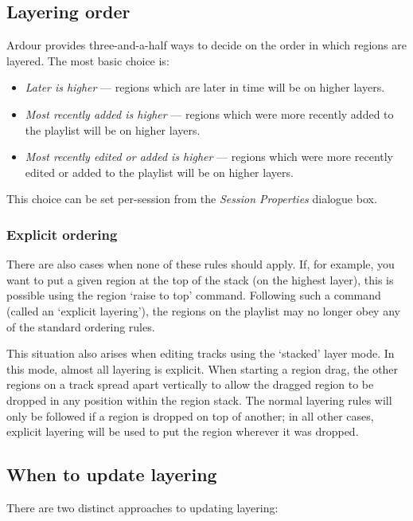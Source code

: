 \documentclass{article}
\begin{document}
\subsection{Layering order}

Ardour provides three-and-a-half ways to decide on the order in which
regions are layered.  The most basic choice is:

\begin{itemize}
\item \emph{Later is higher} --- regions which are later in time will
  be on higher layers.
\item \emph{Most recently added is higher} --- regions which were more
  recently added to the playlist will be on higher layers.
\item \emph{Most recently edited or added is higher} --- regions which
  were more recently edited or added to the playlist will be on
  higher layers.
\end{itemize}

This choice can be set per-session from the \emph{Session Properties} dialogue
box.

\subsubsection{Explicit ordering}

There are also cases when none of these rules should apply.  If, for
example, you want to put a given region at the top of the stack (on
the highest layer), this is possible using the region `raise to top'
command.  Following such a command (called an `explicit layering'),
the regions on the playlist may no longer obey any of the standard
ordering rules.

This situation also arises when editing tracks using the `stacked' layer mode.
In this mode, almost all layering is explicit.  When starting a region drag,
the other regions on a track spread apart vertically to allow the dragged
region to be dropped in any position within the region stack.  The normal
layering rules will only be followed if a region is dropped on top of another;
in all other cases, explicit layering will be used to put the region wherever
it was dropped.

\subsection{When to update layering}

There are two distinct approaches to updating layering:
\end{document}
